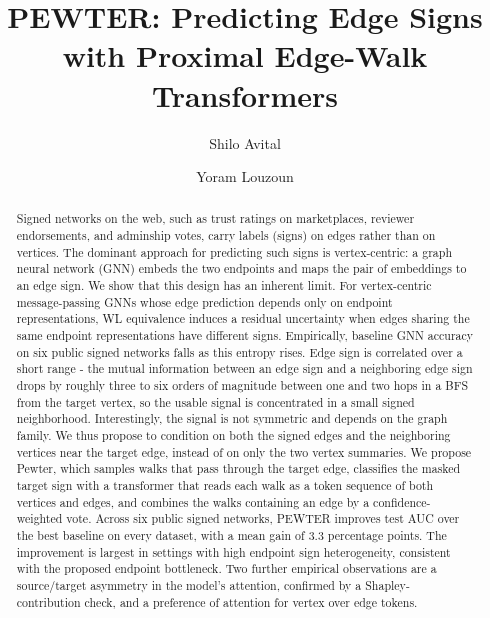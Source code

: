 \documentclass[sigconf]{acmart}
\theoremstyle{plain}
\theoremstyle{definition}
\begin{document}
\title{PEWTER: Predicting Edge Signs with Proximal Edge-Walk Transformers}

\author{Shilo Avital}

\author{Yoram Louzoun}

\begin{abstract}
Signed networks on the web, such as trust ratings on marketplaces, reviewer endorsements, and adminship votes, carry labels (signs) on edges rather than on vertices. The dominant approach for predicting such signs is vertex-centric: a graph neural network (GNN) embeds the two endpoints and maps the pair of embeddings to an edge sign. We show that this design has an inherent limit. For vertex-centric message-passing GNNs whose edge prediction depends only on endpoint representations, WL equivalence induces a residual uncertainty when edges sharing the same endpoint representations have different signs. Empirically, baseline GNN accuracy on six public signed networks falls as this entropy rises. Edge sign is correlated over a short range - the mutual information between an edge sign and a neighboring edge sign drops by roughly three to six orders of magnitude between one and two hops in a BFS from the target vertex, so the usable signal is concentrated in a small signed neighborhood. Interestingly, the signal is not symmetric and depends on the graph family. We thus propose to condition on both the signed edges and the neighboring vertices near the target edge, instead of on only the two vertex summaries. We propose Pewter, which samples walks that pass through the target edge, classifies the masked target sign with a transformer that reads each walk as a token sequence of both vertices and edges, and combines the walks containing an edge by a confidence-weighted vote. Across six public signed networks, PEWTER improves test AUC over the best baseline on every dataset, with a mean gain of 3.3 percentage points. The improvement is largest in settings with high endpoint sign heterogeneity, consistent with the proposed endpoint bottleneck. Two further empirical observations are a source/target asymmetry in the model's attention, confirmed by a Shapley-contribution check, and a preference of attention for vertex over edge tokens.
\end{abstract}
\end{document}

